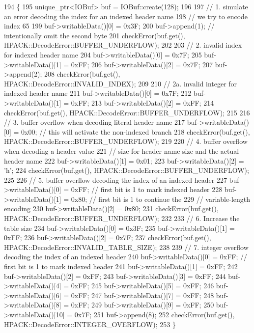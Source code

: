 \begin{DoxyCode}
194                                         \{
195   unique\_ptr<IOBuf> buf = IOBuf::create(128);
196 
197   \textcolor{comment}{// 1. simulate an error decoding the index for an indexed header name}
198   \textcolor{comment}{// we try to encode index 65}
199   buf->writableData()[0] = 0x3F;
200   buf->append(1);  \textcolor{comment}{// intentionally omit the second byte}
201   checkError(buf.get(), HPACK::DecodeError::BUFFER\_UNDERFLOW);
202 
203   \textcolor{comment}{// 2. invalid index for indexed header name}
204   buf->writableData()[0] = 0x7F;
205   buf->writableData()[1] = 0xFF;
206   buf->writableData()[2] = 0x7F;
207   buf->append(2);
208   checkError(buf.get(), HPACK::DecodeError::INVALID\_INDEX);
209 
210   \textcolor{comment}{// 2a. invalid integer for indexed header name}
211   buf->writableData()[0] = 0x7F;
212   buf->writableData()[1] = 0xFF;
213   buf->writableData()[2] = 0xFF;
214   checkError(buf.get(), HPACK::DecodeError::BUFFER\_UNDERFLOW);
215 
216   \textcolor{comment}{// 3. buffer overflow when decoding literal header name}
217   buf->writableData()[0] = 0x00;  \textcolor{comment}{// this will activate the non-indexed branch}
218   checkError(buf.get(), HPACK::DecodeError::BUFFER\_UNDERFLOW);
219 
220   \textcolor{comment}{// 4. buffer overflow when decoding a header value}
221   \textcolor{comment}{// size for header name size and the actual header name}
222   buf->writableData()[1] = 0x01;
223   buf->writableData()[2] = \textcolor{charliteral}{'h'};
224   checkError(buf.get(), HPACK::DecodeError::BUFFER\_UNDERFLOW);
225 
226   \textcolor{comment}{// 5. buffer overflow decoding the index of an indexed header}
227   buf->writableData()[0] = 0xFF; \textcolor{comment}{// first bit is 1 to mark indexed header}
228   buf->writableData()[1] = 0x80; \textcolor{comment}{// first bit is 1 to continue the}
229                                  \textcolor{comment}{// variable-length encoding}
230   buf->writableData()[2] = 0x80;
231   checkError(buf.get(), HPACK::DecodeError::BUFFER\_UNDERFLOW);
232 
233   \textcolor{comment}{// 6. Increase the table size}
234   buf->writableData()[0] = 0x3F;
235   buf->writableData()[1] = 0xFF;
236   buf->writableData()[2] = 0x7F;
237   checkError(buf.get(), HPACK::DecodeError::INVALID\_TABLE\_SIZE);
238 
239   \textcolor{comment}{// 7. integer overflow decoding the index of an indexed header}
240   buf->writableData()[0] = 0xFF; \textcolor{comment}{// first bit is 1 to mark indexed header}
241   buf->writableData()[1] = 0xFF;
242   buf->writableData()[2] = 0xFF;
243   buf->writableData()[3] = 0xFF;
244   buf->writableData()[4] = 0xFF;
245   buf->writableData()[5] = 0xFF;
246   buf->writableData()[6] = 0xFF;
247   buf->writableData()[7] = 0xFF;
248   buf->writableData()[8] = 0xFF;
249   buf->writableData()[9] = 0xFF;
250   buf->writableData()[10] = 0x7F;
251   buf->append(8);
252   checkError(buf.get(), HPACK::DecodeError::INTEGER\_OVERFLOW);
253 \}
\end{DoxyCode}
